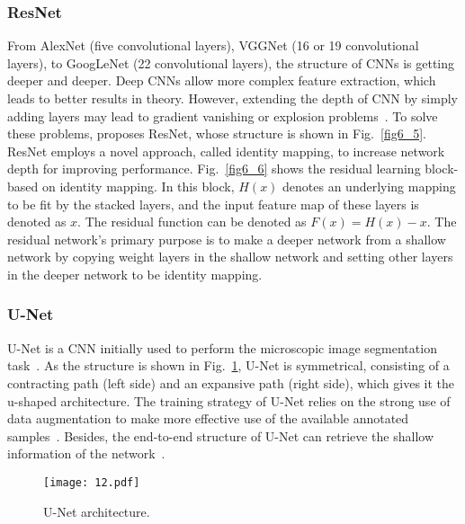 \subsubsection{ResNet}
From AlexNet (five convolutional layers), VGGNet (16 or 19 convolutional layers), to GoogLeNet (22 convolutional layers), the structure of CNNs is getting deeper and deeper. Deep CNNs allow more complex feature extraction, which leads to better results in theory. However, extending the depth of CNN by simply adding layers may lead to gradient vanishing or explosion problems~\cite{Bengio-1994-LLDG,Glorot-2010-UDTD}. To solve these problems, \cite{He-2016-DRLI} proposes ResNet, whose structure is shown in Fig.~\ref{fig6_5}. ResNet employs a novel approach, called identity mapping, to increase network depth for improving performance. Fig.~\ref{fig6_6} shows the residual learning block-based on identity mapping. In this block, $H(x)$ denotes an underlying mapping to be fit by the stacked layers, and the input feature map of these layers is denoted as $x$. The residual function can be denoted as $F(x) = H(x) - x$. The residual network's primary purpose is to make a deeper network from a shallow network by copying weight layers in the shallow network and setting other layers in the deeper network to be identity mapping.


\subsubsection{U-Net}
\label{U-Net}
U-Net is a CNN initially used to perform the microscopic image segmentation task~\cite{Zhang-2021-LANL}. As the structure is shown in Fig.~\ref{fig12}, U-Net is symmetrical, consisting of a contracting path (left side) and an expansive path (right side), which gives it the u-shaped architecture. The training strategy of U-Net relies on the strong use of data augmentation to make more effective use of the available annotated samples~\cite{Ronneberger-2015-UCNB}. Besides, the end-to-end structure of U-Net can retrieve the shallow information of the network~\cite{Ronneberger-2015-UCNB}.

\begin{figure}[htbp!]
\centering
\texttt{[image: 12.pdf]}
\caption{U-Net architecture.}
\label{fig12}
\end{figure}


